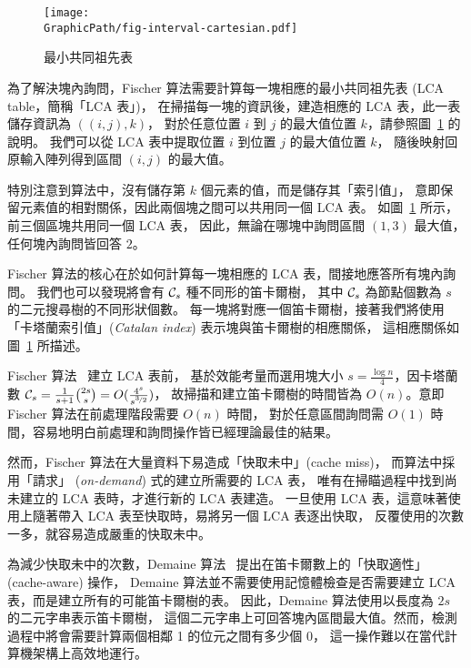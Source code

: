 \begin{figure}[!thb]   
  \centering
  \texttt{[image: \\GraphicPath/fig-interval-cartesian.pdf]}
  \caption{最小共同祖先表}
  \label{fig:ancesstor-cartesian}
\end{figure}

為了解決塊內詢問，Fischer 算法需要計算每一塊相應的最小共同祖先表 (LCA table，簡稱「LCA 表」)，
在掃描每一塊的資訊後，建造相應的 LCA 表，此一表儲存資訊為 $((i, j), k)$，
對於任意位置 $i$ 到 $j$ 的最大值位置 $k$，請參照圖~\ref{fig:ancesstor-cartesian} 的說明。
我們可以從 LCA 表中提取位置 $i$ 到位置 $j$ 的最大值位置 $k$，
隨後映射回原輸入陣列得到區間 $(i, j)$ 的最大值。

特別注意到算法中，沒有儲存第 $k$ 個元素的值，而是儲存其「索引值」，
意即保留元素值的相對關係，因此兩個塊之間可以共用同一個 LCA 表。
如圖~\ref{fig:ancesstor-cartesian} 所示，前三個區塊共用同一個 LCA 表，
因此，無論在哪塊中詢問區間 $(1, 3)$ 最大值，任何塊內詢問皆回答 $2$。

Fischer 算法的核心在於如何計算每一塊相應的 LCA 表，間接地應答所有塊內詢問。
我們也可以發現將會有 ${\cal C}_s$ 種不同形的笛卡爾樹，
其中 ${\cal C}_s$ 為節點個數為 $s$ 的二元搜尋樹的不同形狀個數。
每一塊將對應一個笛卡爾樹，接著我們將使用「卡塔蘭索引值」({\em Catalan index}) 表示塊與笛卡爾樹的相應關係，
這相應關係如圖~\ref{fig:ancesstor-cartesian} 所描述。

Fischer 算法~\cite{Fischer2006TheoreticalAP} 建立 LCA 表前，
基於效能考量而選用塊大小 $s = \frac{\log n}{4}$，因卡塔蘭數 ${\cal C}_s =
\frac{1}{s+1}\binom{2s}{s} = O(\frac{4^s}{s^{\nicefrac{3}{2}}})$，
故掃描和建立笛卡爾樹的時間皆為 $O(n)$。意即 Fischer 算法在前處理階段需要 $O(n)$ 時間，
對於任意區間詢問需 $O(1)$ 時間，容易地明白前處理和詢問操作皆已經理論最佳的結果。

然而，Fischer 算法在大量資料下易造成「快取未中」(cache miss)，
而算法中採用「請求」 ({\em on-demand}) 式的建立所需要的 LCA 表，
唯有在掃瞄過程中找到尚未建立的 LCA 表時，才進行新的 LCA 表建造。
一旦使用 LCA 表，這意味著使用上隨著帶入 LCA 表至快取時，易將另一個 LCA 表逐出快取，
反覆使用的次數一多，就容易造成嚴重的快取未中。

為減少快取未中的次數，Demaine 算法~\cite{Demaine2009OnCT} 
提出在笛卡爾數上的「快取適性」(cache-aware) 操作，
Demaine 算法並不需要使用記憶體檢查是否需要建立 LCA 表，而是建立所有的可能笛卡爾樹的表。
因此，Demaine 算法使用以長度為 $2s$ 的二元字串表示笛卡爾樹，
這個二元字串上可回答塊內區間最大值。然而，檢測過程中將會需要計算兩個相鄰 1 的位元之間有多少個 0，
這一操作難以在當代計算機架構上高效地運行。

